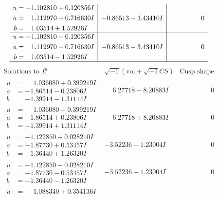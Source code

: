 \documentclass[1p]{elsarticle_modified}
\theoremstyle{definition}
\newcommand{\I}{\sqrt{-1}}
\begin{document}
$$\begin{array}{c|c|c}
\begin{aligned}
u &= -1.102810 + 0.120356 I \\
a &= \phantom{-}1.112970 + 0.716630 I \\
b &= \phantom{-}1.03514 + 1.52926 I\end{aligned}
 & -0.86513 + 3.43410 I & \phantom{-0.000000 } 0 \\ \hline\begin{aligned}
u &= -1.102810 - 0.120356 I \\
a &= \phantom{-}1.112970 - 0.716630 I \\
b &= \phantom{-}1.03514 - 1.52926 I\end{aligned}
 & -0.86513 - 3.43410 I & \phantom{-0.000000 } 0\\
 \hline 
 \end{array}$$\newpage$$\begin{array}{c|c|c}  
\text{Solutions to }I^u_{1}& \I (\text{vol} + \sqrt{-1}CS) & \text{Cusp shape}\\
 \hline 
\begin{aligned}
u &= \phantom{-}1.036080 + 0.399219 I \\
a &= -1.86514 - 0.23806 I \\
b &= -1.39914 - 1.31114 I\end{aligned}
 & \phantom{-}6.27718 - 8.20883 I & \phantom{-0.000000 } 0 \\ \hline\begin{aligned}
u &= \phantom{-}1.036080 - 0.399219 I \\
a &= -1.86514 + 0.23806 I \\
b &= -1.39914 + 1.31114 I\end{aligned}
 & \phantom{-}6.27718 + 8.20883 I & \phantom{-0.000000 } 0 \\ \hline\begin{aligned}
u &= -1.122850 + 0.028210 I \\
a &= -1.87730 + 0.53457 I \\
b &= -1.36440 + 1.26320 I\end{aligned}
 & -3.52236 + 1.23004 I & \phantom{-0.000000 } 0 \\ \hline\begin{aligned}
u &= -1.122850 - 0.028210 I \\
a &= -1.87730 - 0.53457 I \\
b &= -1.36440 - 1.26320 I\end{aligned}
 & -3.52236 - 1.23004 I & \phantom{-0.000000 } 0 \\ \hline\begin{aligned}
u &= \phantom{-}1.088340 + 0.354136 I \\

\end{aligned}
\end{array}$$
\end{document}
